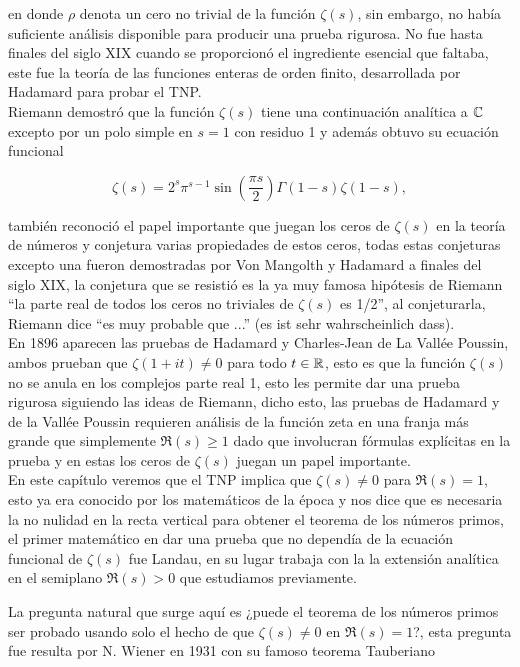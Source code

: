 en donde $\rho$ denota un cero no trivial de la función $\zeta(s)$, sin embargo, no había suficiente análisis disponible para producir una prueba rigurosa. No fue hasta finales del siglo XIX cuando se proporcionó el ingrediente esencial que faltaba, este fue la teoría de las funciones enteras de orden finito, desarrollada por Hadamard para probar el TNP.\\

Riemann demostró que la función $\zeta(s)$ tiene una continuación analítica a $\mathbb{C}$ excepto por un polo simple en $s=1$ con residuo 1 y además obtuvo su ecuación funcional 

\[
\zeta(s) = 2^s \pi^{s-1} \sin\left(\frac{\pi s}{2}\right) \Gamma(1-s) \zeta(1-s),
\]

también reconoció el papel importante que juegan los ceros de $\zeta(s)$ en la teoría de números y conjetura varias propiedades de estos ceros, todas estas conjeturas excepto una fueron demostradas por Von Mangolth y Hadamard a finales del siglo XIX, la conjetura que se resistió es la ya muy famosa hipótesis de Riemann ``la parte real de todos los ceros no triviales de $\zeta(s)$ es 1/2'', al conjeturarla, Riemann dice ``es muy probable que ...'' (es ist sehr wahrscheinlich dass).\\

En 1896 aparecen las pruebas de Hadamard y Charles-Jean de La Vallée Poussin, ambos prueban que $\zeta(1+it)\neq 0$ para todo $t\in \mathbb{R}$, esto es que la función $\zeta(s)$ no se anula en los complejos parte real 1, esto les permite dar una prueba rigurosa siguiendo las ideas de Riemann, dicho esto, las pruebas de Hadamard y de la Vallée Poussin requieren análisis de la función zeta en una franja más grande que simplemente $\Re(s)\geq 1$ dado que involucran fórmulas explícitas en la prueba y en estas los ceros de $\zeta(s)$ juegan un papel importante.\\

En este capítulo veremos que el TNP implica que $\zeta(s)\neq 0$ para $\Re(s)=1$, esto ya era conocido por los matemáticos de la época y nos dice que es necesaria la no nulidad en la recta vertical para obtener el teorema de los números primos, el primer matemático en dar una prueba que no dependía de la ecuación funcional de $\zeta(s)$ fue Landau, en su lugar trabaja con la la extensión analítica en el semiplano $\Re(s)>0$ que estudiamos previamente.

La pregunta natural que surge aquí es ¿puede el teorema de los números primos ser probado usando solo el hecho de que $\zeta(s)\neq 0$ en $\Re(s)=1$?, esta pregunta fue resulta por N. Wiener en 1931 con su famoso teorema Tauberiano


